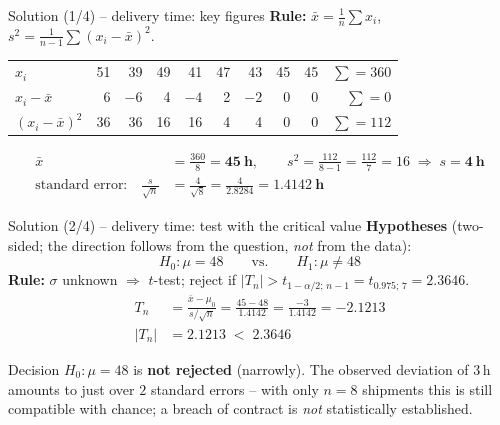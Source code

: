 \documentclass[aspectratio=169,11pt]{beamer}
\begin{document}
\begin{frame}{Solution (1/4) -- delivery time: key figures}
  \textbf{Rule:} $\bar x=\frac1n\sum x_i$, \quad
  $s^2=\frac{1}{n-1}\sum(x_i-\bar x)^2$.
  \begin{center}
    \renewcommand{\arraystretch}{1.15}
    \begin{tabular}{l*{8}{r}r}
      \toprule
      $x_i$            & 51 & 39   & 49 & 41   & 47 & 43   & 45 & 45 & $\sum=360$\\
      $x_i-\bar x$     & 6  & $-6$ & 4  & $-4$ & 2  & $-2$ & 0  & 0  & $\sum=0$\\
      $(x_i-\bar x)^2$ & 36 & 36   & 16 & 16   & 4  & 4    & 0  & 0  & $\sum=112$\\
      \bottomrule
    \end{tabular}
  \end{center}
  \begin{align*}
    \bar x &= \frac{360}{8}=\mathbf{45\ h}, \qquad
    s^2=\frac{112}{8-1}=\frac{112}{7}=16
    \;\Longrightarrow\; s=\mathbf{4\ h}\\[2pt]
    \text{standard error:}\quad \frac{s}{\sqrt n}&=\frac{4}{\sqrt8}
      =\frac{4}{2.8284}=\mathbf{1.4142\ h}
  \end{align*}
\end{frame}

\begin{frame}{Solution (2/4) -- delivery time: test with the critical value}
  \textbf{Hypotheses} (two-sided; the direction follows from the question,
  \emph{not} from the data):
  \[
    H_0:\mu=48 \qquad\text{vs.}\qquad H_1:\mu\neq48
  \]
  \textbf{Rule:} $\sigma$ unknown $\Rightarrow$ $t$-test; reject if
  $|T_n|>t_{1-\alpha/2;\,n-1}=t_{0.975;\,7}=2.3646$.
  \begin{align*}
    T_n &= \frac{\bar x-\mu_0}{s/\sqrt n}=\frac{45-48}{1.4142}
         =\frac{-3}{1.4142}=\mathbf{-2.1213}\\[2pt]
    |T_n| &= 2.1213 \;<\; 2.3646
  \end{align*}
  \begin{exampleblock}{Decision}
    $H_0:\mu=48$ is \textbf{not rejected} (narrowly). The observed deviation of
    $3$\,h amounts to just over $2$ standard errors -- with only $n=8$
    shipments this is still compatible with chance; a breach of contract is
    \emph{not} statistically established.
  \end{exampleblock}
\end{frame}
\end{document}
